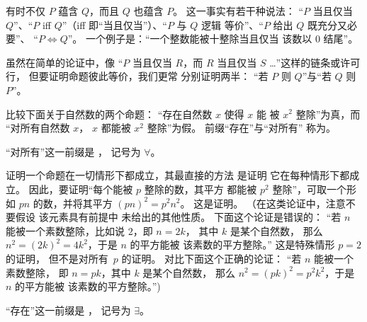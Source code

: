 


有时不仅 \( P \) 蕴含 \( Q \)，而且
\( Q \) 也蕴含 \( P \)。
这一事实有若干种说法：
“\( P \) 当且仅当
\( Q \)”、“\( P \) iff \( Q \)”（iff 即“当且仅当”）、“\( P \) 与 \( Q \) 逻辑
等价”、“\( P \) 给出 \( Q \) 既充分又必要”、
“\( P\iff Q \)”。
一个例子是：“一个整数能被十整除当且仅当  
该数以 $0$ 结尾”。

虽然在简单的论证中，像
“\( P \) 当且仅当 $R$，而 $R$ 当且仅当 $S$ \ldots{}”这样的链条或许可行，
但要证明命题彼此等价，我们更常
分别证明两半：
“若 \( P \) 则 \( Q \)”与“若 \( Q \) 则 \( P \)”。






%
比较下面关于自然数的两个命题：
“存在自然数 \( x \) 使得 \( x \) 能
被 \( x^2 \) 整除”为真，而
“对所有自然数 \( x \)，
\( x \) 都能被 \( x^2 \) 整除”为假。
前缀“存在”与“对所有”
称为。

“对所有”这一前缀是
， 
记号为 \( \forall \)。

证明一个命题在一切情形下都成立，其最直接的方法
是证明
它在每种情形下都成立。
因此，要证明“每个能被 \( p \) 整除的数，其平方
都能被 \( p^2 \) 整除”，可取一个形如
\( pn \) 的数，并将其平方 \( (pn)^2=p^2n^2 \)。
这是证明。
（在这类论证中，注意不要假设 
该元素具有前提中
未给出的其他性质。
下面这个论证是错误的：
“若 \( n \) 能被一个素数整除，比如说 \( 2 \)，即 \( n=2k \)，
其中 \( k \) 是某个自然数，
那么 \( n^2=(2k)^2=4k^2 \)，于是 $n$ 的平方能被
该素数的平方整除。”
这是特殊情形 \( p=2 \) 的证明，
但不是对所有~\( p \) 的证明。
对比下面这个正确的论证：
“若 \( n \) 能被一个素数整除，
即 \( n=pk \)，其中 \( k \) 是某个自然数，
那么 \( n^2=(pk)^2=p^2k^2 \)，于是 $n$ 的平方能被
该素数的平方整除。”)




“存在”这一前缀是
，
记号为
\( \exists \)。


